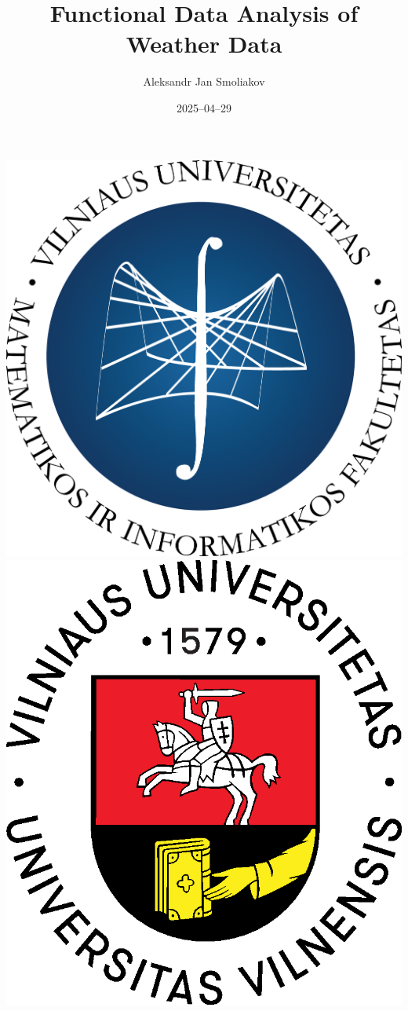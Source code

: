 \documentclass[svgnames, 12pt]{beamer}
\title[FDA of Weather Data]{Functional Data Analysis of Weather Data}%
\author[A. J. Smoliakov]{Aleksandr Jan Smoliakov\inst{1}}
\institute[VU MIF]{\inst{1} Vilnius University, Faculty of Mathematics and Informatics}
\date{2025--04--29}
\begin{document}
\begin{frame}
\includegraphics[scale=0.15]{MIF Garamond-logo.png} 
\hfill
\includegraphics[scale=0.15]{Logo_spalvotas.eps}

\titlepage
\end{frame}
\end{document}
